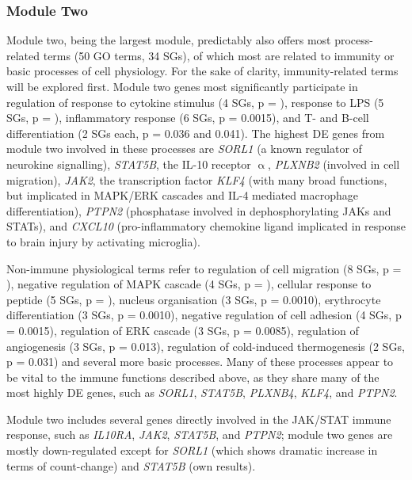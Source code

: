 \subsubsection{Module Two}
Module two, being the largest module, predictably also offers most process-related terms (50 GO terms, 34 SGs), of which most are related to immunity or basic processes of cell physiology. For the sake of clarity, immunity-related terms will be explored first. Module two genes most significantly participate in regulation of response to cytokine stimulus (4 SGs, p = ), response to LPS (5 SGs, p = ), inflammatory response (6 SGs, p = 0.0015), and T- and B-cell differentiation (2 SGs each, p = 0.036 and 0.041). The highest DE genes from module two involved in these processes are \emph{SORL1} (a known regulator of neurokine signalling), \emph{STAT5B}, the IL-10 receptor $\upalpha$, \emph{PLXNB2} (involved in cell migration),  \emph{JAK2}, the transcription factor \emph{KLF4} (with many broad functions, but implicated in MAPK/ERK cascades and IL-4 mediated macrophage differentiation\cite{Ghaleb2017}), \emph{PTPN2} (phosphatase involved in dephosphorylating JAKs and STATs), and \emph{CXCL10} (pro-inflammatory chemokine ligand implicated in response to brain injury by activating microglia).
 
Non-immune physiological terms refer to regulation of cell migration (8 SGs, p = ), negative regulation of MAPK cascade (4 SGs, p = ), cellular response to peptide (5 SGs, p = ), nucleus organisation (3 SGs, p = 0.0010), erythrocyte differentiation (3 SGs, p = 0.0010), negative regulation of cell adhesion (4 SGs, p = 0.0015), regulation of ERK cascade (3 SGs, p = 0.0085), regulation of angiogenesis (3 SGs, p = 0.013), regulation of cold-induced thermogenesis (2 SGs, p = 0.031) and several more basic processes. Many of these processes appear to be vital to the immune functions described above, as they share many of the most highly DE genes, such as \emph{SORL1}, \emph{STAT5B}, \emph{PLXNB4}, \emph{KLF4}, and \emph{PTPN2}. 

Module two includes several genes directly involved in the JAK/STAT immune response, such as \emph{IL10RA}, \emph{JAK2}, \emph{STAT5B}, and \emph{PTPN2}; module two genes are mostly down-regulated except for \emph{SORL1} (which shows dramatic increase in terms of count-change) and \emph{STAT5B} (own results).

